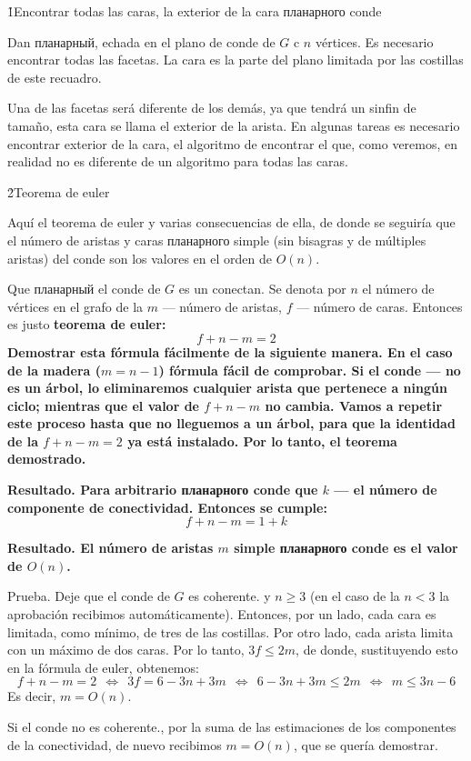 \h1{Encontrar todas las caras, la exterior de la cara планарного conde}

Dan планарный, echada en el plano de conde de $G$ c $n$ vértices. Es necesario encontrar todas las facetas. La cara es la parte del plano limitada por las costillas de este recuadro.

Una de las facetas será diferente de los demás, ya que tendrá un sinfin de tamaño, esta cara se llama el exterior de la arista. En algunas tareas es necesario encontrar exterior de la cara, el algoritmo de encontrar el que, como veremos, en realidad no es diferente de un algoritmo para todas las caras.


\h2{Teorema de euler}

Aquí el teorema de euler y varias consecuencias de ella, de donde se seguiría que el número de aristas y caras планарного simple (sin bisagras y de múltiples aristas) del conde son los valores en el orden de $O(n)$.

Que планарный el conde de $G$ es un conectan. Se denota por $n$ el número de vértices en el grafo de la $m$ --- número de aristas, $f$ --- número de caras. Entonces es justo \bf{teorema de euler}:
$$ f + n - m = 2 $$
Demostrar esta fórmula fácilmente de la siguiente manera. En el caso de la madera ($m=n-1$) fórmula fácil de comprobar. Si el conde --- no es un árbol, lo eliminaremos cualquier arista que pertenece a ningún ciclo; mientras que el valor de $f+n-m$ no cambia. Vamos a repetir este proceso hasta que no lleguemos a un árbol, para que la identidad de la $f+n-m=2$ ya está instalado. Por lo tanto, el teorema demostrado.

\bf{Resultado}. Para arbitrario планарного conde que $k$ --- el número de componente de conectividad. Entonces se cumple:
$$ f + n - m = 1 + k $$

\bf{Resultado}. El número de aristas $m$ simple планарного conde es el valor de $O(n)$.

Prueba. Deje que el conde de $G$ es coherente. y $n \ge 3$ (en el caso de la $n < 3$ la aprobación recibimos automáticamente). Entonces, por un lado, cada cara es limitada, como mínimo, de tres de las costillas. Por otro lado, cada arista limita con un máximo de dos caras. Por lo tanto, $3f \le 2m$, de donde, sustituyendo esto en la fórmula de euler, obtenemos:
$$ f + n - m = 2\ \ \Leftrightarrow\ \ 3f = 6 - 3n + 3m\ \ \Leftrightarrow\ \ 6 - 3n + 3m \le 2m\ \ \Leftrightarrow\ \ m \le 3n - 6 $$
Es decir, $m = O(n)$.

Si el conde no es coherente., por la suma de las estimaciones de los componentes de la conectividad, de nuevo recibimos $m = O(n)$, que se quería demostrar.

